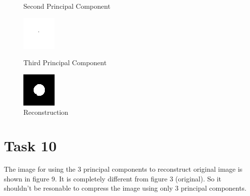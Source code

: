 \documentclass[11pt]{article}
\theoremstyle{plain}
\theoremstyle{definition}
\begin{document}
\begin{figure}[!htb]
\begin {minipage}{0.48\textwidth}
     \caption{Second Principal Component}\label{Fig:Second Principal Component}
   \end{minipage}\hfill 
      \begin {minipage}{0.48\textwidth}
     \centering
     \includegraphics[width=.7\linewidth]{Task9_3.png}
     \caption{Third Principal Component}\label{Fig:Third Principal Component}
   \end{minipage}\hfill 
   \begin {minipage}{0.48\textwidth}
     \centering
     \includegraphics[width=.7\linewidth]{Task10.png}
     \caption{Reconstruction}\label{Fig:Reconstruction}
   \end{minipage}\hfill 
\end{figure} 

\section{Task 10}
The image for using the 3 principal components to reconstruct original image is shown in figure 9. It is completely different from figure 3 (original). So it shouldn't be resonable to compress the image using only 3 principal components. 
\end{document}
